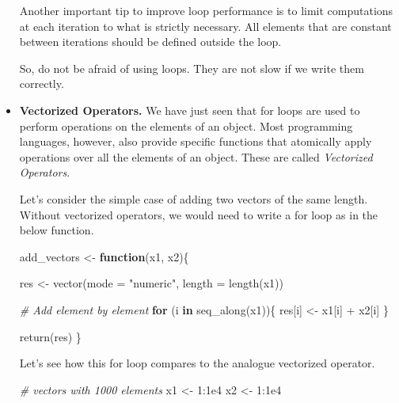 \documentclass[
  11pt,
]{book}
\newenvironment{Shaded}{\begin{snugshade}}{\end{snugshade}}
\newcommand{\AttributeTok}[1]{\textcolor[rgb]{0.77,0.63,0.00}{#1}}
\newcommand{\CommentTok}[1]{\textcolor[rgb]{0.56,0.35,0.01}{\textit{#1}}}
\newcommand{\ControlFlowTok}[1]{\textcolor[rgb]{0.13,0.29,0.53}{\textbf{#1}}}
\newcommand{\DecValTok}[1]{\textcolor[rgb]{0.00,0.00,0.81}{#1}}
\newcommand{\FloatTok}[1]{\textcolor[rgb]{0.00,0.00,0.81}{#1}}
\newcommand{\FunctionTok}[1]{\textcolor[rgb]{0.00,0.00,0.00}{#1}}
\newcommand{\NormalTok}[1]{#1}
\newcommand{\OtherTok}[1]{\textcolor[rgb]{0.56,0.35,0.01}{#1}}
\newcommand{\SpecialCharTok}[1]{\textcolor[rgb]{0.00,0.00,0.00}{#1}}
\newcommand{\StringTok}[1]{\textcolor[rgb]{0.31,0.60,0.02}{#1}}
\newenvironment{code-tex-warn}
  {\begingroup\definecolor{shadecolor}{RGB}{249, 249, 154}}
  {\endgroup}
\begin{document}
\begin{itemize}
  Another important tip to improve loop performance is to limit computations at each iteration to what is strictly necessary. All elements that are constant between iterations should be defined outside the loop.

  So, do not be afraid of using loops. They are not slow if we write them correctly.
\item
  \textbf{Vectorized Operators.} We have just seen that for loops are used to perform operations on the elements of an object. Most programming languages, however, also provide specific functions that atomically apply operations over all the elements of an object. These are called \emph{Vectorized Operators}.

  Let's consider the simple case of adding two vectors of the same length. Without vectorized operators, we would need to write a for loop as in the below function.

  \begin{code-tex-warn}

\begin{Shaded}
\begin{Highlighting}[]
\NormalTok{add\_vectors }\OtherTok{\textless{}{-}} \ControlFlowTok{function}\NormalTok{(x1, x2)\{}

\NormalTok{  res }\OtherTok{\textless{}{-}} \FunctionTok{vector}\NormalTok{(}\AttributeTok{mode =} \StringTok{"numeric"}\NormalTok{, }\AttributeTok{length =} \FunctionTok{length}\NormalTok{(x1))}

  \CommentTok{\# Add element by element}
  \ControlFlowTok{for}\NormalTok{ (i }\ControlFlowTok{in} \FunctionTok{seq\_along}\NormalTok{(x1))\{}
\NormalTok{    res[i] }\OtherTok{\textless{}{-}}\NormalTok{ x1[i] }\SpecialCharTok{+}\NormalTok{ x2[i]  }
\NormalTok{  \}}

  \FunctionTok{return}\NormalTok{(res)}
\NormalTok{\}}
\end{Highlighting}
\end{Shaded}

  \end{code-tex-warn}

  Let's see how this for loop compares to the analogue vectorized operator.

\begin{Shaded}
\begin{Highlighting}[]
\CommentTok{\# vectors with 1000 elements}
\NormalTok{x1 }\OtherTok{\textless{}{-}} \DecValTok{1}\SpecialCharTok{:}\FloatTok{1e4}
\NormalTok{x2 }\OtherTok{\textless{}{-}} \DecValTok{1}\SpecialCharTok{:}\FloatTok{1e4}


\end{Highlighting}
\end{Shaded}
\end{itemize}
\end{document}
